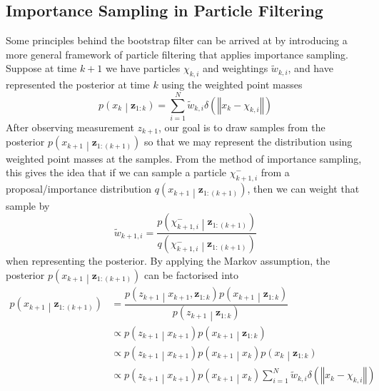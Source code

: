 \documentclass[11pt]{report} %
\begin{document}
\subsection{Importance Sampling in Particle Filtering}

Some principles behind the bootstrap filter can be arrived at by introducing a more general framework of particle filtering that applies importance sampling. Suppose at time $k + 1$ we have particles $\chi_{k, i}$ and weightings $\widetilde{w}_{k, i}$, and have represented the posterior at time $k$ using the weighted point masses
\begin{equation}
p\left(x_{k}\middle|\mathbf{z}_{1:k}\right) = \sum_{i = 1}^{N}\widetilde{w}_{k, i}\delta\left(\left\Vert x_{k} - \chi_{k, i}\right\Vert\right)
\end{equation}
After observing measurement $z_{k + 1}$, our goal is to draw samples from the posterior $p\left(x_{k + 1}\middle|\mathbf{z}_{1:\left(k + 1\right)}\right)$ so that we may represent the distribution using weighted point masses at the samples. From the method of importance sampling, this gives the idea that if we can sample a particle $\chi_{k + 1, i}^{-}$ from a proposal/importance distribution $q\left(x_{k + 1}\middle|\mathbf{z}_{1:\left(k + 1\right)}\right)$, then we can weight that sample by
\begin{equation}
\widetilde{w}_{k + 1, i} = \dfrac{p\left(\chi_{k + 1, i}^{-}\middle|\mathbf{z}_{1:\left(k + 1\right)}\right)}{q\left(\chi_{k + 1, i}^{-}\middle|\mathbf{z}_{1:\left(k + 1\right)}\right)}
\end{equation}
when representing the posterior. By applying the Markov assumption, the posterior $p\left(x_{k + 1}\middle|\mathbf{z}_{1:\left(k + 1\right)}\right)$ can be factorised into
\begin{align}
\ensuremath{p\left(x_{k+1}\middle|\mathbf{z}_{1:\left(k+1\right)}\right)} &= \dfrac{p\left(z_{k+1}\middle|x_{k+1},\mathbf{z}_{1:k}\right)p\left(x_{k+1}\middle|\mathbf{z}_{1:k}\right)}{p\left(z_{k+1}\middle|\mathbf{z}_{1:k}\right)} \\
&\propto p\left(z_{k+1}\middle|x_{k+1}\right)p\left(x_{k+1}\middle|\mathbf{z}_{1:k}\right) \\
&\propto p\left(z_{k+1}\middle|x_{k+1}\right)p\left(x_{k+1}\middle|x_{k}\right)p\left(x_{k}\middle|\mathbf{z}_{1:k}\right) \\
&\propto p\left(z_{k+1}\middle|x_{k+1}\right)p\left(x_{k+1}\middle|x_{k}\right)\sum_{i=1}^{N}\widetilde{w}_{k,i}\delta\left(\left\Vert x_{k}-\chi_{k,i}\right\Vert \right)
\end{align}
\end{document}
